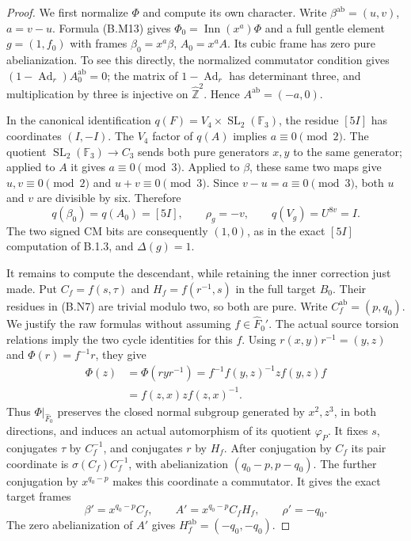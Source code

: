 \begin{proof}
We first normalize $\Phi$ and compute its own
character.  Write $\beta^{\mathrm{ab}}=(u,v)$,
$a=v-u$.  Formula (B.M13) gives
$\Phi_0=\operatorname{Inn}(x^a)\Phi$ and a full
gentle element $g=(1,f_0)$ with frames
$\beta_0=x^a\beta$, $A_0=x^a A$.
Its cubic frame has zero pure abelianization.
To see this directly, the normalized commutator
condition gives
$(1-\operatorname{Ad}_r)A_0^{\mathrm{ab}}=0$;
the matrix of $1-\operatorname{Ad}_r$ has determinant
three, and multiplication by three is injective
on $\widehat{\mathbb Z}^{2}$.  Hence
$A^{\mathrm{ab}}=(-a,0)$.

In the canonical identification
$q(F)=V_4\times\operatorname{SL}_2(\mathbb F_3)$,
the residue $[5I]$ has coordinates $(I,-I)$.
The $V_4$ factor of $q(A)$ implies $a\equiv0\pmod2$.
The quotient
$\operatorname{SL}_2(\mathbb F_3)\to C_3$
sends both pure generators $x,y$ to the same
generator; applied to $A$ it gives $a\equiv0\pmod3$.
Applied to $\beta$, these same two maps give
$u,v\equiv0\pmod2$ and $u+v\equiv0\pmod3$.
Since $v-u=a\equiv0\pmod3$, both $u$ and $v$
are divisible by six.  Therefore
\[
 q(\beta_0)=q(A_0)=[5I],\qquad
 \rho_g=-v,\qquad q(V_g)=U^{8v}=I.             \tag{B.N8}
\]
The two signed CM bits are consequently $(1,0)$,
as in the exact $[5I]$ computation of B.1.3, and
$\Delta(g)=1$.

It remains to compute the descendant, while retaining
the inner correction just made.  Put
$C_f=f(s,\tau)$ and $H_f=f(r^{-1},s)$ in the
full target $\widehat B_0$.  Their residues in
(B.N7) are trivial modulo two, so both are pure.
Write $C_f^{\mathrm{ab}}=(p,q_0)$.  We justify the
raw formulas without assuming $f\in\widehat F_0'$.
The actual source torsion relations imply the two
cycle identities for this $f$.  Using
$r(x,y)r^{-1}=(y,z)$ and $\Phi(r)=f^{-1}r$, they give
\[
\begin{split}
 \Phi(z)&=\Phi(ryr^{-1})
       =f^{-1}f(y,z)^{-1}z f(y,z)f\\
       &=f(z,x)z f(z,x)^{-1}.
\end{split}
\]
Thus $\Phi|_{\widehat F_0}$ preserves the closed
normal subgroup generated by $x^2,z^3$, in both
directions, and induces an actual automorphism of
its quotient $\varphi_P$.  It fixes $s$, conjugates
$\tau$ by $C_f^{-1}$, and conjugates $r$ by $H_f$.
After conjugation by $C_f$ its pair coordinate is
$\sigma(C_f)C_f^{-1}$, with abelianization
$(q_0-p,p-q_0)$.  The further conjugation by
$x^{q_0-p}$ makes this coordinate a commutator.
It gives the exact target frames
\[
 \beta'=x^{q_0-p}C_f,\qquad
 A'=x^{q_0-p}C_fH_f,\qquad
 \rho'=-q_0.                                   \tag{B.N9}
\]
The zero abelianization of $A'$ gives
$H_f^{\mathrm{ab}}=(-q_0,-q_0)$.


\end{proof}
